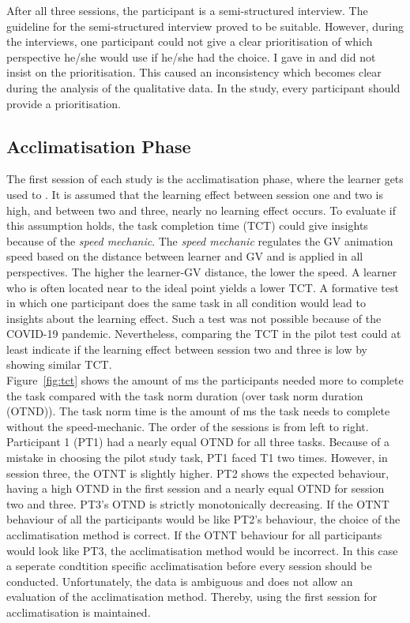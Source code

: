 After all three sessions, the participant is a semi-structured interview. The guideline for the semi-structured interview proved to be suitable. However, during the interviews, one participant could not give a clear prioritisation of which perspective he/she would use if he/she had the choice. I gave in and did not insist on the prioritisation. This caused an inconsistency which becomes clear during the analysis of the qualitative data. In the study, every participant should provide a prioritisation.


\subsection{Acclimatisation Phase}
The first session of each study is the acclimatisation phase, where the learner gets used to \exgo. It is assumed that the learning effect between session one and two is high, and between two and three, nearly no learning effect occurs. To evaluate if this assumption holds, the task completion time (TCT) could give insights because of the \textit{speed mechanic}. The \textit{speed mechanic} regulates the GV animation speed based on the distance between learner and GV and is applied in all perspectives. The higher the learner-GV distance, the lower the speed. A learner who is often located near to the ideal point yields a lower TCT. A formative test in which one participant does the same task in all condition would lead to insights about the learning effect. Such a test was not possible because of the COVID-19 pandemic. Nevertheless, comparing the TCT in the pilot test could at least indicate if the learning effect between session two and three is low by showing similar TCT.\\
Figure~\ref{fig:tct} shows the amount of ms the participants needed more to complete the task compared with the task norm duration (over task norm duration (OTND)). The task norm time is the amount of ms the task needs to complete without the speed-mechanic. The order of the sessions is from left to right. Participant 1 (PT1) had a nearly equal OTND for all three tasks. Because of a mistake in choosing the pilot study task, PT1 faced T1 two times. However, in session three, the OTNT is slightly higher. PT2 shows the expected behaviour, having a high OTND in the first session and a nearly equal OTND for session two and three. PT3's OTND is strictly monotonically decreasing. If the OTNT behaviour of all the participants would be like PT2's behaviour, the choice of the acclimatisation method is correct. If the OTNT behaviour for all participants would look like PT3, the acclimatisation method would be incorrect. In this case a seperate condtition specific acclimatisation before every session should be conducted. Unfortunately, the data is ambiguous and does not allow an evaluation of the acclimatisation method. Thereby, using the first session for acclimatisation is maintained.


